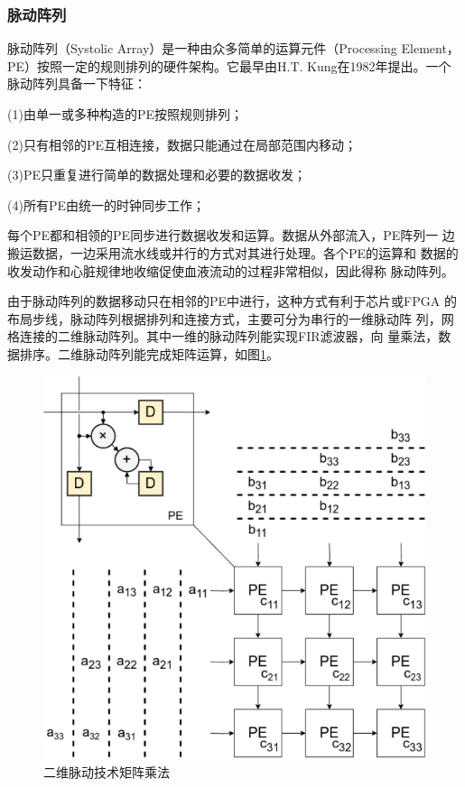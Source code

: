 \documentclass{article}
\numberwithin {equation}{section}
\begin{document}
\begin{spacing}{1.25}
      \subsubsection{脉动阵列}
        \vspace{1em}
        脉动阵列（Systolic Array）是一种由众多简单的运算元件（Processing 
        Element，PE）按照一定的规则排列的硬件架构。它最早由H.T.
        Kung在1982年提出。一个脉动阵列具备一下特征：

        (1)由单一或多种构造的PE按照规则排列；

        (2)只有相邻的PE互相连接，数据只能通过在局部范围内移动；

        (3)PE只重复进行简单的数据处理和必要的数据收发；

        (4)所有PE由统一的时钟同步工作；

        每个PE都和相领的PE同步进行数据收发和运算。数据从外部流入，PE阵列一
        边搬运数据，一边采用流水线或并行的方式对其进行处理。各个PE的运算和
        数据的收发动作和心脏规律地收缩促使血液流动的过程非常相似，因此得称
        脉动阵列。

        由于脉动阵列的数据移动只在相邻的PE中进行，这种方式有利于芯片或FPGA
        的布局步线，脉动阵列根据排列和连接方式，主要可分为串行的一维脉动阵
        列，网格连接的二维脉动阵列。其中一维的脉动阵列能实现FIR滤波器，向
        量乘法，数据排序。二维脉动阵列能完成矩阵运算，如图\ref{2D array}。
        \begin{figure}[H]
          \centering
          \includegraphics[scale=1]{./pictures/2Darray.png}
          \caption{二维脉动技术矩阵乘法}
          \label{2D array}
        \end{figure}


\end{spacing}
\end{document}
